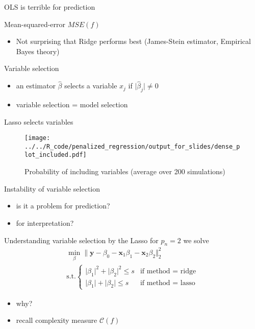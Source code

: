 \documentclass[xcolor=dvipsnames, handout]{beamer}
\begin{document}
\begin{frame}{OLS is terrible for prediction}
\begin{table}
  
  \caption{Mean-squared-error $MSE(f)$}
\end{table}
\begin{itemize}
  \item Not surprising that Ridge performs best (James-Stein estimator, Empirical Bayes theory)
\end{itemize}
\end{frame}


\begin{frame}{Variable selection}
\begin{itemize}
  \item an estimator $\hat{\beta}$ selects a variable $x_j$ if $\lvert \hat{\beta}_j \rvert \neq 0$
  \item variable selection = model selection
\end{itemize}
\end{frame}


\begin{frame}{Lasso selects variables}
\begin{figure}
  \texttt{[image: ../../R\_code/penalized\_regression/output\_for\_slides/dense\_plot\_included.pdf]}
   \caption{Probability of including variables (average over 200 simulations)}
\end{figure}
\end{frame}


\begin{frame}{Instability of variable selection}
\begin{itemize}
  \item is it a problem for prediction?
  \item for interpretation?
\end{itemize}
\end{frame}


\begin{frame}{Understanding variable selection by the Lasso}
for $p_n = 2$ we solve 
\begin{align*}
  \min_{\beta} \lVert \mathbf{y} - \beta_0 - \mathbf{x}_1\beta_1 - \mathbf{x}_2\beta_2 \Vert_2^2
  \\
  \text{s.t.} \begin{cases}
    \lvert\beta_1\rvert^2 + \lvert \beta_2\rvert^2 \leq s & \text{if method = ridge}
  \\
    \lvert \beta_1\vert + \lvert \beta_2 \rvert \leq s & \text{if method = lasso}
  \end{cases}
\end{align*}
\begin{itemize}[<+->]
  \item why?
  \item recall complexity measure $\mathcal{C}(f)$
\end{itemize}
\end{frame}
\end{document}
